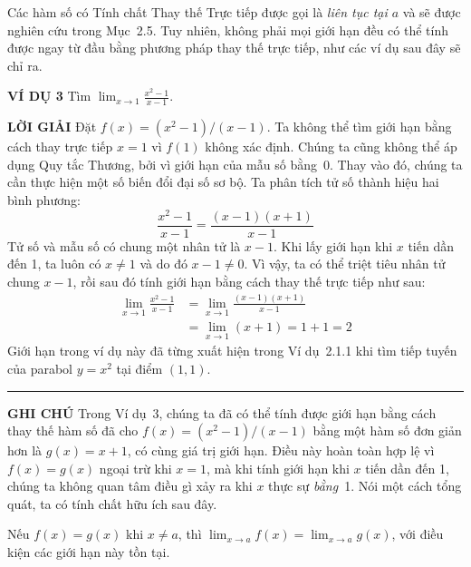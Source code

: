 \begin{minipage}[t]{0.71\textwidth}
    \vspace*{0pt}
    Các hàm số có Tính chất Thay thế Trực tiếp được gọi là \textit{liên tục tại $a$} và sẽ được nghiên cứu trong Mục~2.5. Tuy nhiên, không phải mọi giới hạn đều có thể tính được ngay từ đầu bằng phương pháp thay thế trực tiếp, như các ví dụ sau đây sẽ chỉ ra.

    \vspace{0.25cm}
    \noindent
    \textbf{\textsf{\color{stewartcyan}VÍ DỤ 3}} \quad Tìm $\displaystyle \lim_{x \to 1} \frac{x^2 - 1}{x - 1}$.

    \vspace{0.15cm}
    \noindent
    \textbf{\textsf{\color{stewartcyan}LỜI GIẢI}} \quad Đặt $f(x) = (x^2 - 1)/(x - 1)$. Ta không thể tìm giới hạn bằng cách thay trực tiếp $x = 1$ vì $f(1)$ không xác định. Chúng ta cũng không thể áp dụng Quy tắc Thương, bởi vì giới hạn của mẫu số bằng~0. Thay vào đó, chúng ta cần thực hiện một số biến đổi đại số sơ bộ. Ta phân tích tử số thành hiệu hai bình phương:
    \[
    \frac{x^2 - 1}{x - 1} = \frac{(x - 1)(x + 1)}{x - 1}
    \]
    Tử số và mẫu số có chung một nhân tử là $x - 1$. Khi lấy giới hạn khi $x$ tiến dần đến 1, ta luôn có $x \neq 1$ và do đó $x - 1 \neq 0$. Vì vậy, ta có thể triệt tiêu nhân tử chung $x - 1$, rồi sau đó tính giới hạn bằng cách thay thế trực tiếp như sau:
    \begin{align*}
    \lim_{x \to 1} \frac{x^2 - 1}{x - 1} &= \lim_{x \to 1} \frac{(x - 1)(x + 1)}{x - 1} \\[5pt]
    &= \lim_{x \to 1} (x + 1) = 1 + 1 = 2
    \end{align*}
    Giới hạn trong ví dụ này đã từng xuất hiện trong Ví dụ~2.1.1 khi tìm tiếp tuyến của parabol $y = x^2$ tại điểm $(1, 1)$. \hfill {\color{stewartcyan}\rule{1.1ex}{1.1ex}}

    \vspace{0.25cm}
    \noindent
    \textbf{\textsf{\color{stewartcyan}GHI CHÚ}} \quad Trong Ví dụ~3, chúng ta đã có thể tính được giới hạn bằng cách thay thế hàm số đã cho $f(x) = (x^2 - 1)/(x - 1)$ bằng một hàm số đơn giản hơn là $g(x) = x + 1$, có cùng giá trị giới hạn. Điều này hoàn toàn hợp lệ vì $f(x) = g(x)$ ngoại trừ khi $x = 1$, mà khi tính giới hạn khi $x$ tiến dần đến 1, chúng ta không quan tâm điều gì xảy ra khi $x$ thực sự \textit{bằng}~1. Nói một cách tổng quát, ta có tính chất hữu ích sau đây.

    \vspace{0.2cm}
    \begin{tcolorbox}[
        colback=white,
        colframe=stewartred,
        arc=0mm,
        boxrule=0.8pt,
        left=10pt,
        right=10pt,
        top=7pt,
        bottom=7pt
    ]
    Nếu $f(x) = g(x)$ khi $x \neq a$, thì $\displaystyle \lim_{x \to a} f(x) = \lim_{x \to a} g(x)$, với điều kiện các giới hạn này tồn tại.
    \end{tcolorbox}


\end{minipage}
